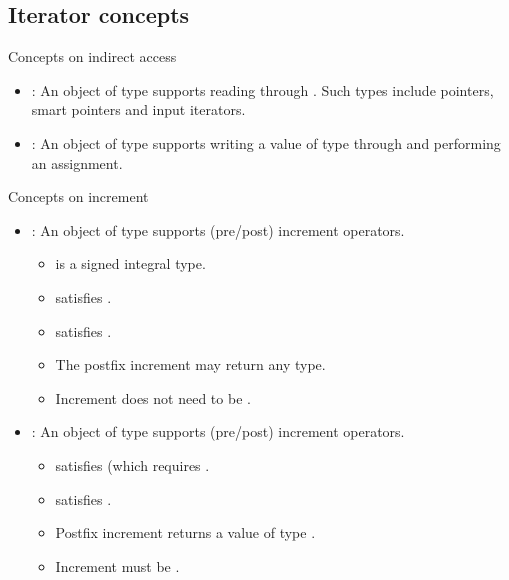 \subsection{Iterator concepts}

\begin{frame}[t,fragile]{Concepts on indirect access}
\begin{itemize}
  \item {}:
        An object of type  supports reading through .
        Such types include pointers, smart pointers and input iterators.

  \item {}:
        An object of type  supports writing a value of type
        through  and performing an assignment.
        
\end{itemize}
\end{frame}

\begin{frame}[t,fragile]{Concepts on increment}
\begin{itemize}
  \item {}:
        An object of type  supports (pre/post) increment operators.
          \begin{itemize}
            \item {} is a signed integral type.
            \item {} satisfies .
            \item {} satisfies .
            \item The postfix increment may return any type.
            \item Increment does not need to be .
          \end{itemize}

  \item {}:
        An object of type  supports (pre/post) increment operators.
          \begin{itemize}
            \item {} satisfies  
                  (which requires .
            \item {} satisfies .
            \item Postfix increment returns a value of type .
            \item Increment must be .
          \end{itemize}
\end{itemize}
\end{frame}

